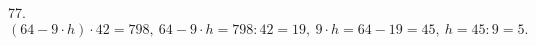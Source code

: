 77. $(64 - 9 \cdot h) \cdot 42 = 798,\ 64 - 9 \cdot h=798:42=19,\ 9 \cdot h=64-19=45,\ h=45:9=5.$\\
